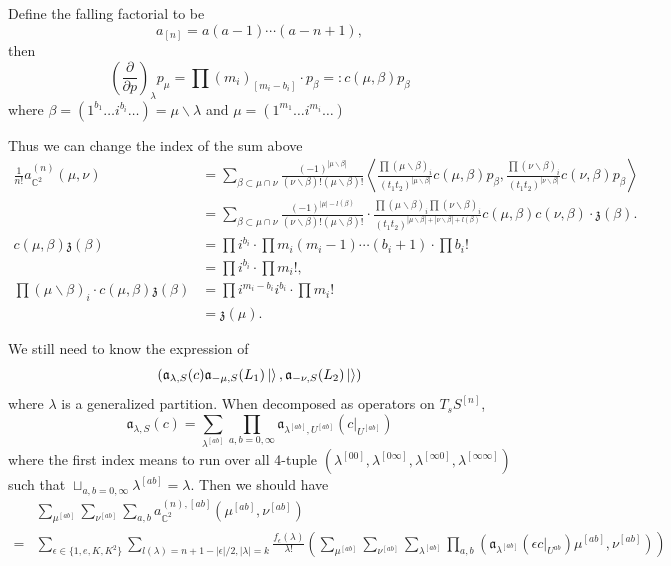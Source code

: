 \documentclass{article}
\renewcommand{\frak}[1]{\mathfrak{#1}}
\newcommand{\lr}[1]{\left({#1}\right)}
\newcommand{\inprod}[1]{\left<{#1}\right>}
\newcommand{\C}{\mathbb{C}}
\newcommand{\vacuum}{\ket{}}
\newcommand{\p}{\partial}
\begin{document}
Define the falling factorial to be \[a_{[n]}=a(a-1)\cdots (a-n+1),\]then 
\[\lr{\frac{\p}{\p p}}_{\lambda}p_{\mu}=\prod(m_i)_{[m_i-b_i]}\cdot p_{\beta}=: c(\mu,\beta)p_\beta\]where $\beta = (1^{b_1}\ldots i^{b_i}\ldots)=\mu\backslash\lambda$ and $\mu = (1^{m_1}\ldots i^{m_i}\ldots)$

Thus we can change the index of the sum above
\[
\begin{aligned}
\frac{1}{n!}a^{(n)}_{\C^2}(\mu,\nu)&=\sum_{\beta\subset\mu\cap\nu}\frac{(-1)^{|\mu\backslash\beta|}}{(\nu\backslash\beta)!(\mu\backslash\beta)!}\inprod{\frac{\prod(\mu\backslash\beta)_i}{(t_1t_2)^{|\mu\backslash\beta|}}c(\mu,\beta)p_\beta,\frac{\prod(\nu\backslash\beta)_i}{(t_1t_2)^{|\nu\backslash\beta|}}c(\nu,\beta)p_\beta}\\
&= \sum_{\beta\subset\mu\cap\nu}\frac{(-1)^{|\mu|-l(\beta)}}{(\nu\backslash\beta)!(\mu\backslash\beta)!}\cdot\frac{\prod(\mu\backslash\beta)_i\prod(\nu\backslash\beta)_i}{(t_1t_2)^{|\mu\backslash\beta|+|\nu\backslash\beta|+l(\beta)}}c(\mu,\beta)c(\nu,\beta)\cdot\frak{z}(\beta).\\
c(\mu,\beta)\frak{z}(\beta) &= \prod i^{b_i}\cdot \prod m_i(m_i-1)\cdots (b_i+1)\cdot\prod b_i!\\
&= \prod i^{b_i}\cdot \prod m_i!,\\
\prod(\mu\backslash\beta)_i\cdot c(\mu,\beta)\frak{z}(\beta) &= \prod i^{m_i-b_i}i^{b_i}\cdot \prod m_i!\\
&= \frak{z}(\mu).
\end{aligned}
\]

We still need to know the expression of \[\lr{\frak{a}_{\lambda,S}(c)\frak{a}_{-\mu,S}(L_1)\vacuum, \frak{a}_{-\nu,S}(L_2)\vacuum}\]
where $\lambda$ is a generalized partition. When decomposed as operators on $T_sS^{[n]}$, \[\frak{a}_{\lambda,S}(c)=\sum_{\lambda^{[ab]}}\prod_{a,b=0,\infty}\frak{a}_{\lambda^{[ab]},U^{[ab]}}(c|_{U^{[ab]}})\]where the first index means to run over all 4-tuple $(\lambda^{[00]}, \lambda^{[0\infty]}, \lambda^{[\infty0]}, \lambda^{[\infty\infty]})$ such that $\sqcup_{a,b=0,\infty}\lambda^{[ab]}=\lambda.$ Then we should have
\[
\begin{aligned}
&\sum_{\mu^{[ab]}}\sum_{\nu^{[ab]}}\sum_{a,b}a^{(n),[ab]}_{\C^2}(\mu^{[ab]},\nu^{[ab]}) \\
= &\sum_{\epsilon\in\{1,e,K,K^2\}} \sum_{\mathit{l}(\lambda)=n+1-|\epsilon|/2,|\lambda|=k} \frac{f_\epsilon(\lambda)} {\lambda!} \left(\sum_{\mu^{[ab]}}\sum_{\nu^{[ab]}}\sum_{\lambda^{[ab]}}\prod_{a,b}\lr{\mathfrak{a}_{\lambda^{[ab]}}(\epsilon c|_{U^{ab}})\mu^{[ab]},\nu^{[ab]}}\right)
\end{aligned}
\]
\end{document}
